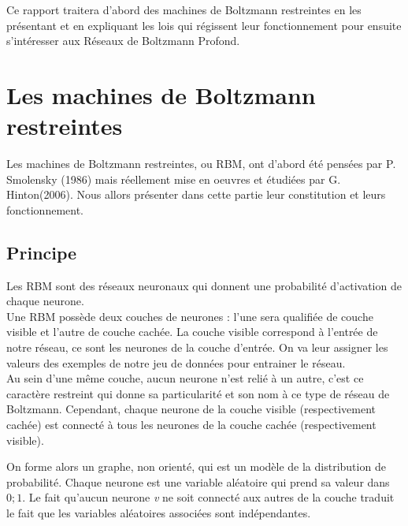 \documentclass[a4paper,oneside]{report}
\begin{document}
            Ce rapport traitera d'abord des machines de Boltzmann restreintes en les
            présentant et en expliquant les lois qui régissent leur fonctionnement pour
            ensuite s'intéresser aux Réseaux de Boltzmann Profond.

        \chapter{Les machines de Boltzmann restreintes}

            Les machines de Boltzmann restreintes, ou RBM, ont d'abord été
            pensées par P. Smolensky (1986) mais réellement mise en oeuvres et
            étudiées par G.
            Hinton(2006). Nous allors présenter dans cette partie leur constitution et
            leurs fonctionnement.

            \section{Principe}

                Les RBM sont des réseaux neuronaux qui donnent une
                probabilité d'activation de chaque neurone.\\

                Une RBM possède deux couches de neurones : l'une sera qualifiée 
                de couche visible et l'autre de couche cachée.
                La couche visible correspond à l'entrée de notre réseau, ce sont
                les neurones de la couche d'entrée. On va leur assigner les
                valeurs des exemples de notre jeu de données pour entrainer le
                réseau.\\

                Au sein d'une même couche, aucun neurone n'est relié à un
                autre, c'est ce caractère restreint qui donne sa particularité 
                et son nom à ce type de réseau de Boltzmann.
                Cependant, chaque neurone de la couche visible (respectivement
                cachée) est connecté à tous les neurones de la couche cachée 
                (respectivement visible). 
                
                On forme alors un graphe, non orienté, qui est un
                modèle de la distribution de probabilité. Chaque neurone est une variable aléatoire
                qui prend sa valeur dans \begin{math}{0;1}\end{math}. Le fait
                qu'aucun neurone \textit{v} ne soit connecté aux autres de la
                couche traduit le fait que les variables aléatoires associées
                sont indépendantes.
                
\end{document}
